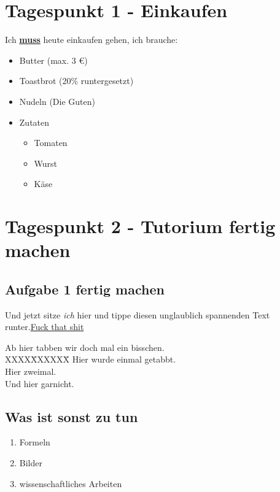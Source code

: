 \documentclass[12pt, a4paper,ngerman]{scrartcl}
\begin{document}
\tableofcontents
\section{Tagespunkt 1 - Einkaufen}\label{sec:TP1}
Ich \underline{\textbf{muss}} heute einkaufen gehen, ich brauche:
\begin{itemize}
    \item Butter (max. 3 \euro)
    \item Toastbrot (20\% runtergesetzt)
    \item Nudeln (\glqq Die Guten\grqq)
    \item Zutaten 
    \begin{itemize}
        \item Tomaten
        \item Wurst
        \item K\"ase
    \end{itemize}
\end{itemize}
\section{Tagespunkt 2 - Tutorium fertig machen}\label{sec:TP2}
\subsection{Aufgabe 1 fertig machen}
Und jetzt sitze \textit{ich} hier und tippe diesen unglaublich spannenden Text runter.\hyperref[sec:TP1]{Fuck that shit}
\begin{tabbing}
Ab hier tabben wir doch mal ein bisschen.\\
XXXX\=XXXXXX\=\kill
\>Hier wurde einmal getabbt.\\
\>\> Hier zweimal.\\
Und hier garnicht.
\end{tabbing}
\subsection{Was ist sonst zu tun}
\begin{enumerate}
    \item Formeln
    \item Bilder
    \item wissenschaftliches Arbeiten
\end{enumerate}
\end{document}
